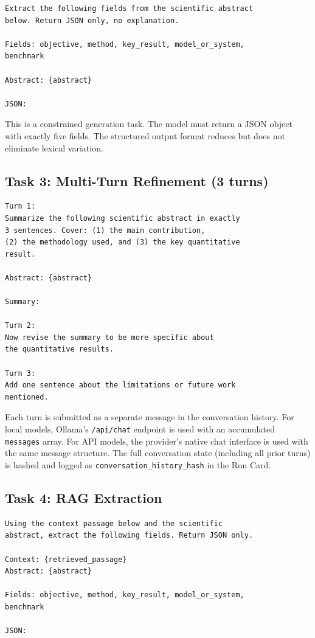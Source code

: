 \documentclass[11pt]{article}
\begin{document}
\begin{lstlisting}[caption={Prompt template for Task 2 (structured extraction).}]
Extract the following fields from the scientific abstract
below. Return JSON only, no explanation.

Fields: objective, method, key_result, model_or_system,
benchmark

Abstract: {abstract}

JSON:
\end{lstlisting}

\noindent This is a constrained generation task. The model must return a JSON object with exactly five fields. The structured output format reduces but does not eliminate lexical variation.

\subsection{Task 3: Multi-Turn Refinement (3 turns)}

\begin{lstlisting}[caption={Prompt template for Task 3 (multi-turn refinement, 3 turns).}]
Turn 1:
Summarize the following scientific abstract in exactly
3 sentences. Cover: (1) the main contribution,
(2) the methodology used, and (3) the key quantitative
result.

Abstract: {abstract}

Summary:

Turn 2:
Now revise the summary to be more specific about
the quantitative results.

Turn 3:
Add one sentence about the limitations or future work
mentioned.
\end{lstlisting}

\noindent Each turn is submitted as a separate message in the conversation history. For local models, Ollama's \texttt{/api/chat} endpoint is used with an accumulated \texttt{messages} array. For API models, the provider's native chat interface is used with the same message structure. The full conversation state (including all prior turns) is hashed and logged as \texttt{conversation\_history\_hash} in the Run Card.

\subsection{Task 4: RAG Extraction}

\begin{lstlisting}[caption={Prompt template for Task 4 (RAG extraction).}]
Using the context passage below and the scientific
abstract, extract the following fields. Return JSON only.

Context: {retrieved_passage}
Abstract: {abstract}

Fields: objective, method, key_result, model_or_system,
benchmark

JSON:
\end{lstlisting}
\end{document}
